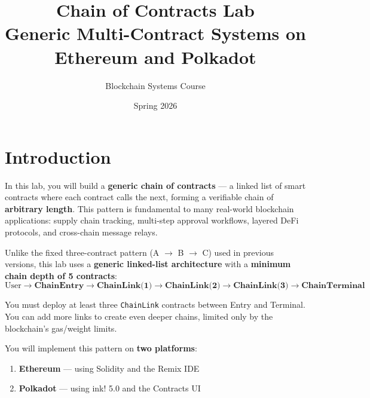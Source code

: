 \documentclass[11pt,a4paper]{article}
\title{\textbf{Chain of Contracts Lab} \\\large Generic Multi-Contract Systems on Ethereum and Polkadot}
\author{Blockchain Systems Course}
\date{Spring 2026}
\begin{document}
\maketitle
\thispagestyle{empty}

\vspace{1cm}
\begin{center}
\end{center}
\vspace{1cm}

\newpage
\tableofcontents
\newpage

\section{Introduction}

In this lab, you will build a \textbf{generic chain of contracts} --- a
linked list of smart contracts where each contract calls the next, forming
a verifiable chain of \textbf{arbitrary length}. This pattern is fundamental
to many real-world blockchain applications: supply chain tracking, multi-step
approval workflows, layered DeFi protocols, and cross-chain message relays.

Unlike the fixed three-contract pattern (A $\to$ B $\to$ C) used in previous
versions, this lab uses a \textbf{generic linked-list architecture} with a
\textbf{minimum chain depth of 5 contracts}:
\[
\text{User} \longrightarrow \textbf{ChainEntry} \longrightarrow \textbf{ChainLink(1)} \longrightarrow \textbf{ChainLink(2)} \longrightarrow \textbf{ChainLink(3)} \longrightarrow \textbf{ChainTerminal}
\]

You must deploy at least three \texttt{ChainLink} contracts between Entry and
Terminal. You can add more links to create even deeper chains, limited only by
the blockchain's gas/weight limits.

You will implement this pattern on \textbf{two platforms}:
\begin{enumerate}
    \item \textbf{Ethereum} --- using Solidity and the Remix IDE
    \item \textbf{Polkadot} --- using ink! 5.0 and the Contracts UI
\end{enumerate}
\end{document}
